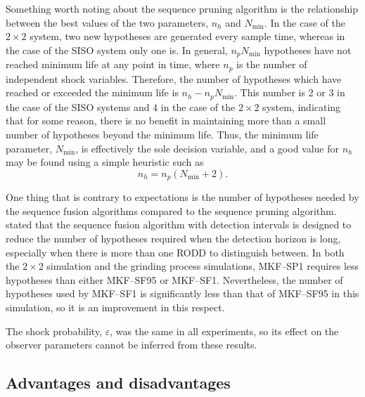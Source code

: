 Something worth noting about the sequence pruning algorithm is the relationship between the best values of the two parameters, $n_h$ and $N_\text{min}$. In the case of the $2 \times 2$ system, two new hypotheses are generated every sample time, whereas in the case of the \gls{SISO} system only one is. In general, $n_pN_\text{min}$ hypotheses have not reached minimum life at any point in time, where $n_p$ is the number of independent shock variables. Therefore, the number of hypotheses which have reached or exceeded the minimum life is $n_h - n_p N_\text{min}$. This number is 2 or 3 in the case of the \gls{SISO} systems and 4 in the case of the $2 \times 2$ system, indicating that for some reason, there is no benefit in maintaining more than a small number of hypotheses beyond the minimum life. Thus, the minimum life parameter, $N_\text{min}$, is effectively the sole decision variable, and a good value for $n_h$ may be found using a simple heuristic such as
\begin{equation} \label{eq:nh-sp}
	n_h = n_p(N_\text{min}+2).
\end{equation}

One thing that is contrary to expectations is the number of hypotheses needed by the sequence fusion algorithms compared to the sequence pruning algorithm. \cite{robertson_method_1998} stated that the sequence fusion algorithm with detection intervals is designed to reduce the number of hypotheses required when the detection horizon is long, especially when there is more than one \gls{RODD} to distinguish between. In both the $2 \times 2$ simulation and the grinding process simulations, MKF--SP1 requires less hypotheses than either MKF--SF95 or MKF--SF1. Nevertheless, the number of hypotheses used by MKF--SF1 is significantly less than that of MKF--SF95 in this simulation, so it is an improvement in this respect.

The shock probability, $\varepsilon$, was the same in all experiments, so its effect on the observer parameters cannot be inferred from these results.

\subsection{Advantages and disadvantages} \label{sec-disc-obs-performance}

